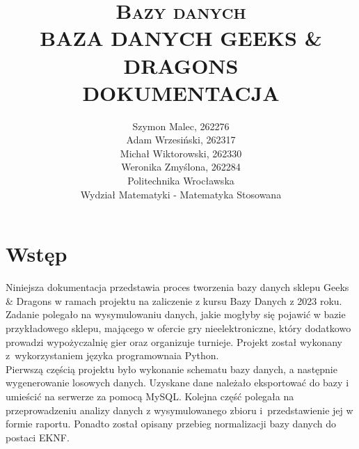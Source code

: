 \documentclass{article}
\begin{document}
	\title{ \LARGE \textsc{Bazy danych}
		\\ [5.5cm]
		\huge \textbf{\uppercase{Baza danych Geeks \& Dragons}}
		\\ [0.5cm]
		\large \textbf{\uppercase{Dokumentacja}}
		}
	\date{}
	\maketitle
	\vspace{7.5cm}
	
	\begin{center}
	\author{
		Szymon Malec, 262276 \\
		Adam Wrzesiński, 262317\\
		Michał Wiktorowski, 262330 \\
		Weronika Zmyślona, 262284 \\
		\vspace{0.5cm}
		Politechnika Wrocławska \\
		Wydział Matematyki - Matematyka Stosowana}
	\end{center}
	
	\thispagestyle{empty}
	
	\newpage\thispagestyle{empty}
	\mbox{}
	
	\setcounter {page}{1}
	
	\tableofcontents
	
	\newpage
	\section{Wstęp}
	Niniejsza dokumentacja przedstawia proces tworzenia bazy danych sklepu Geeks \& Dragons w ramach projektu na zaliczenie z kursu Bazy Danych z 2023 roku. Zadanie polegało na wysymulowaniu danych, jakie mogłyby się pojawić w bazie przykładowego sklepu, mającego w ofercie gry nieelektroniczne, który dodatkowo prowadzi wypożyczalnię gier oraz organizuje turnieje. Projekt został wykonany z~wykorzystaniem języka programownaia Python.\\
	
	Pierwszą częścią projektu było wykonanie schematu bazy danych, a następnie wygenerowanie losowych danych. Uzyskane dane należało eksportować do bazy i umieścić na serwerze za pomocą MySQL. Kolejna część polegała na przeprowadzeniu analizy danych z wysymulowanego zbioru i~przedstawienie jej w formie raportu. Ponadto został opisany przebieg normalizacji bazy danych do postaci EKNF. 
	
\end{document}

